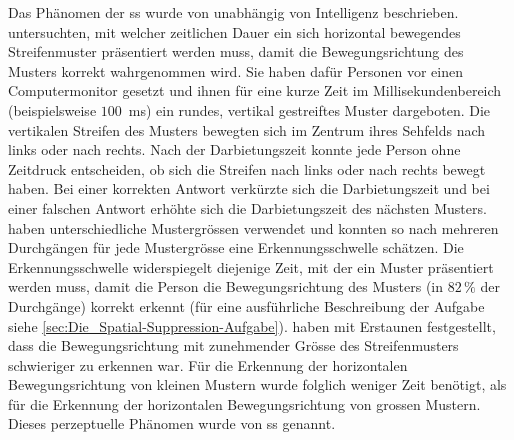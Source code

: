 \documentclass[11pt, twoside, a4paper]{book}		%
\begin{document}
Das Phänomen der \gls{ss} wurde von \citet{Tadin2003} unabhängig von  Intelligenz beschrieben. \citet{Tadin2003} untersuchten, mit welcher zeitlichen Dauer ein sich horizontal bewegendes Streifenmuster präsentiert werden muss, damit die Bewegungsrichtung des Musters korrekt wahrgenommen wird.
Sie haben dafür Personen vor einen Computermonitor gesetzt und ihnen für eine kurze Zeit im Millisekundenbereich (beispielsweise $100$~ms) ein rundes, vertikal gestreiftes Muster dargeboten. Die vertikalen Streifen des Musters bewegten sich im Zentrum ihres Sehfelds nach links oder nach rechts. Nach der Darbietungszeit konnte jede Person ohne Zeitdruck entscheiden, ob sich die Streifen nach links oder nach rechts bewegt haben. Bei einer korrekten Antwort verkürzte sich die Darbietungszeit und bei einer falschen Antwort erhöhte sich die Darbietungszeit des nächsten Musters. 
\citet{Tadin2003} haben unterschiedliche Mustergrössen verwendet und konnten so nach mehreren Durchgängen für jede Mustergrösse eine Erkennungsschwelle schätzen. Die Erkennungsschwelle widerspiegelt diejenige Zeit, mit der ein Muster präsentiert werden muss, damit die Person die Bewegungsrichtung des Musters (in $82\,\%$ der Durchgänge) korrekt erkennt (für eine ausführliche Beschreibung der Aufgabe siehe \autoref{sec:Die_Spatial-Suppression-Aufgabe}).
\citet{Tadin2003} haben mit Erstaunen festgestellt, dass die Bewegungsrichtung mit zunehmender Grösse des Streifenmusters schwieriger zu erkennen war. Für die Erkennung der horizontalen Bewegungsrichtung von kleinen Mustern wurde folglich weniger Zeit benötigt, als für die Erkennung der horizontalen Bewegungsrichtung von grossen Mustern. Dieses perzeptuelle Phänomen wurde von \citet{Tadin2003} \gls{ss} genannt. 
\end{document}
